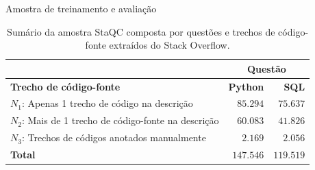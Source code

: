 \documentclass[10pt]{beamer}
\begin{document}
\begin{frame}{Amostra de treinamento e avaliação}
   \begin{table}[!b]
        \begin{tabularx}{\textwidth}{Xrr}
            & \multicolumn{2}{c}{\textbf{Questão}}\\
            \toprule
          \textbf{Trecho de código-fonte} & \textbf{Python} & \textbf{SQL}  \\
          \toprule
          
            $N_{1}$: Apenas 1 trecho de código na descrição & $85.294$ & $75.637$ \\
            
            $N_{2}$: Mais de 1 trecho de código-fonte na descrição & $60.083$ & $41.826$ \\
            
            $N_{3}$: Trechos de códigos anotados manualmente & $2.169$ & $2.056$  \\
          \bottomrule
          \textbf{Total} & $\bm{147.546}$ & $\bm{119.519}$\\
          \bottomrule
        \end{tabularx}%
        \caption{Sumário da amostra StaQC composta por questões e trechos de código-fonte extraídos do Stack Overflow.}
    \label{table:summary-training-data-yao-staqc}
        \end{table}
\end{frame}
\end{document}
